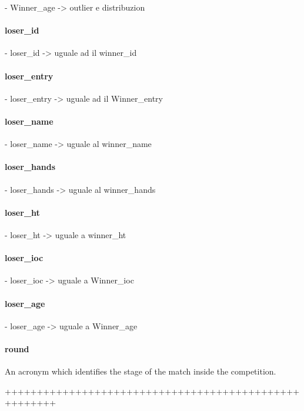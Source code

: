 \documentclass{article}
\begin{document}
- Winner_age -> outlier e distribuzion

\paragraph{loser\_id}

- loser_id -> uguale ad il winner_id

\paragraph{loser\_entry}

- loser_entry ->  uguale ad il Winner_entry

\paragraph{loser\_name}

- loser_name -> uguale al winner_name

\paragraph{loser\_hands}

- loser_hands -> uguale al winner_hands

\paragraph{loser\_ht}

- loser_ht -> uguale a winner_ht

\paragraph{loser\_ioc}

- loser_ioc -> uguale a Winner_ioc

\paragraph{loser\_age}

- loser_age -> uguale a Winner_age

\paragraph{round}

An acronym which identifies the stage of the match inside the competition.


++++++++++++++++++++++++++++++++++++++++++++++++++++++
\end{document}
